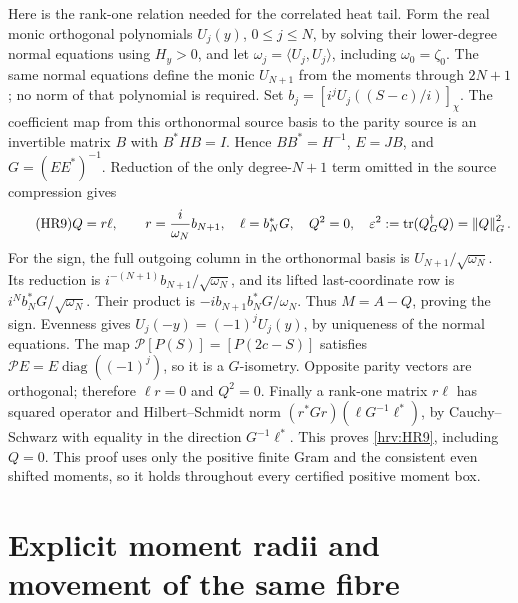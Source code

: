 Here is the rank-one relation needed for the correlated heat tail.
Form the real monic orthogonal polynomials \(U_j(y)\), \(0\le j\le N\),
by solving their lower-degree normal equations using \(H_y>0\), and
let \(\omega_j=\langle U_j,U_j\rangle\), including
\(\omega_0=\zeta_0\). The same normal equations define the monic
\(U_{N+1}\) from the moments through \(2N+1\); no norm of that polynomial
is required. Set \(b_j=[i^jU_j((S-c)/i)]_\chi\). The coefficient map
from this orthonormal source basis to the parity source is an invertible
matrix \(B\) with \(B^*HB=I\). Hence \(BB^*=H^{-1}\),
\(E=JB\), and \(G=(EE^*)^{-1}\). Reduction of the only degree-\(N+1\)
term omitted in the source compression gives
\begin{equation}\tag{HR9}\label{hrv:HR9}
Q=r\ell,\qquad r=\frac{i}{\omega_N}b_{N+1},\quad
\ell=b_N^*G,\quad Q^2=0,\quad
\varepsilon^2:=\operatorname{tr}(Q^\dagger_G Q)=\left\lVert Q\right\rVert_G^2.
\end{equation}
For the sign, the full outgoing column in the orthonormal basis is
\(U_{N+1}/\sqrt{\omega_N}\). Its reduction is
\(i^{-(N+1)}b_{N+1}/\sqrt{\omega_N}\), and its lifted last-coordinate
row is \(i^N b_N^*G/\sqrt{\omega_N}\). Their product is
\(-i b_{N+1}b_N^*G/\omega_N\). Thus \(M=A-Q\), proving the sign.
Evenness gives \(U_j(-y)=(-1)^jU_j(y)\), by uniqueness of the normal
equations. The map \(\mathcal P[P(S)]=[P(2c-S)]\) satisfies
\(\mathcal PE=E\operatorname{diag}((-1)^j)\), so it is a \(G\)-isometry.
Opposite parity vectors are orthogonal; therefore \(\ell r=0\) and
\(Q^2=0\). Finally a rank-one matrix \(r\ell\) has squared operator
and Hilbert--Schmidt norm \((r^*Gr)(\ell G^{-1}\ell^*)\), by
Cauchy--Schwarz with equality in the direction \(G^{-1}\ell^*\).
This proves \eqref{hrv:HR9}, including \(Q=0\). This proof uses only the
positive finite Gram and the consistent even shifted moments, so it
holds throughout every certified positive moment box.

\section{Explicit moment radii and movement of the same fibre}

